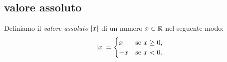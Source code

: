 %
%
%

\subsection{valore assoluto}

\begin{definition}
\mymark{***}
Definiamo il \emph{valore assoluto}%
%
 ${\left|x\right|}$ di un numero $x\in {\mathbb R}$ nel seguente modo:
\[
{\left|x\right|} =
\begin{cases}
  x & \text{se $x\ge 0$}, \\
  -x & \text{se $x<0 $}.
\end{cases}
\]
\end{definition}
  
